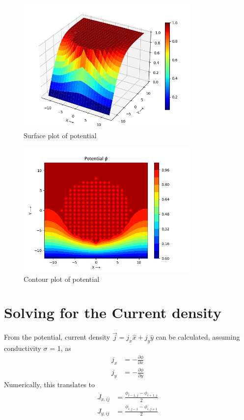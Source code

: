 \documentclass[12pt, a4paper]{article}
\begin{document}
\begin{figure}
\centering
\includegraphics[width=0.8\textwidth]{Figure_2.png}
\caption{Surface plot of potential}
\end{figure}

\begin{figure}
\centering
\includegraphics[width=0.8\textwidth]{Figure_3.png}
\caption{Contour plot of potential}
\end{figure}

\section{Solving for the Current density}

\paragraph*{}
From the potential, current density $\vec{j} = j_x \hat{x} + j_y \hat{y} $ can be calculated, assuming conductivity $\sigma$ = 1, as 
\begin{align*}
j_x &= -\frac{\partial{\phi}}{\partial{x}} \\
j_y &= -\frac{\partial{\phi}}{\partial{y}}
\end{align*}
Numerically, this translates to
\begin{align*}
J_{x,ij} &= \frac{\phi_{i-1,j} - \phi_{i+1,j}}{2} \\
J_{y,ij} &= \frac{\phi_{i,j-1} - \phi_{i,j+1}}{2}
\end{align*}
\end{document}
